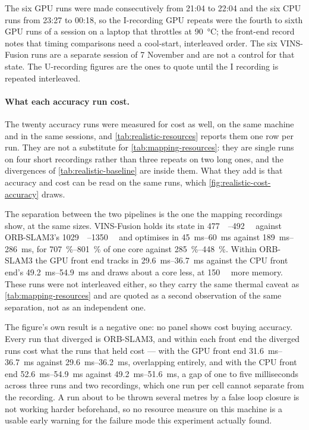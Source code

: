 \documentclass[11pt,a4paper,notitlepage]{report}
\begin{document}
\begin{queried} The six GPU runs were made consecutively
from 21:04 to 22:04 and the six CPU runs from 23:27 to 00:18, so the
I-recording GPU repeats were the fourth to sixth GPU runs of a session on a
laptop that throttles at \SI{90}{\celsius}; the front-end record notes that
timing comparisons need a cool-start, interleaved order. The six VINS-Fusion
runs are a separate session of 7 November and are not a control for that
state. The U-recording figures are the ones to quote until the I recording is
repeated interleaved. \end{queried} 

\paragraph{What each accuracy run cost.} The twenty accuracy runs were
measured for cost as well, on the same machine and in the same sessions, and
\cref{tab:realistic-resources} reports them one row per run. They are not a
substitute for \cref{tab:mapping-resources}: they are single runs on four
short recordings rather than three repeats on two long ones, and the
divergences of \cref{tab:realistic-baseline} are inside them. What they add is
that accuracy and cost can be read on the same runs, which
\cref{fig:realistic-cost-accuracy} draws.

The separation between the two pipelines is the one the mapping recordings
show, at the same sizes. VINS-Fusion holds its state in \SIrange{477}{492}{\mebi\byte}
against ORB-SLAM3's \SIrange{1029}{1350}{\mebi\byte} and optimises in
\SIrange{45}{60}{\milli\second} against \SIrange{189}{286}{\milli\second},
for \SIrange{707}{801}{\percent} of one core against
\SIrange{285}{448}{\percent}. Within ORB-SLAM3 the GPU front end tracks in
\SIrange{29.6}{36.7}{\milli\second} against the CPU front end's
\SIrange{49.2}{54.9}{\milli\second} and draws about a core less, at
\SI{150}{\mebi\byte} more memory. These runs were not interleaved either, so
they carry the same thermal caveat as \cref{tab:mapping-resources} and are
quoted as a second observation of the same separation, not as an independent
one.

The figure's own result is a negative one: no panel shows cost buying
accuracy. Every run that diverged is ORB-SLAM3, and within each front end the
diverged runs cost what the runs that held cost --- with the GPU front end
\SIrange{31.6}{36.7}{\milli\second} against \SIrange{29.6}{36.2}{\milli\second},
overlapping entirely, and with the CPU front end
\SIrange{52.6}{54.9}{\milli\second} against \SIrange{49.2}{51.6}{\milli\second},
a gap of one to five milliseconds across three runs and two recordings, which
one run per cell cannot separate from the recording. A run about to be thrown
several metres by a false loop closure is not working harder beforehand, so no
resource measure on this machine is a usable early warning for the failure
mode this experiment actually found.
\end{document}
